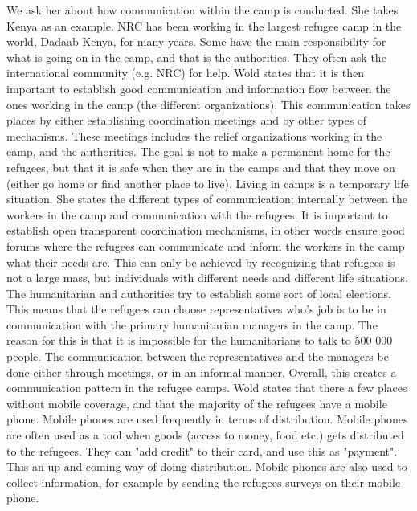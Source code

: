 We ask her about how communication within the camp is conducted. She takes Kenya as an example. NRC has been working in the largest refugee camp in the world, Dadaab Kenya, for many years.  Some have the main responsibility for what is going on in the camp, and that is the  authorities. They often ask the international community (e.g. NRC) for help. Wold states that it is then important to establish good communication and information flow between the ones working in the camp (the different organizations). This communication takes places by either establishing coordination meetings and by other types of mechanisms. These meetings includes the relief organizations working in the camp, and the authorities. The goal is not to make a permanent home for the refugees, but that it is safe when they are in the camps and that they move on (either go home or find another place to live). Living in camps is a temporary life situation. She states the different types of communication; internally between the workers in the camp and communication with the refugees. It is important to establish open transparent coordination mechanisms, in other words ensure good forums where the refugees can communicate and inform the workers in the camp what their needs are. This can only be achieved by recognizing that refugees is not a large mass, but individuals with different needs and different life situations. The humanitarian and authorities try to establish some sort of local elections. This means that the refugees can choose representatives who's job is to be in communication with the primary humanitarian managers in the camp. The reason for this is that it is impossible for the humanitarians to talk to 500 000 people. The communication between the representatives and the managers be done either through meetings, or in an informal manner. Overall, this creates a communication pattern in the refugee camps. Wold states that there a few places without mobile coverage, and that the majority of the refugees have a mobile phone. Mobile phones are used frequently in terms of distribution. Mobile phones are often used as a tool when goods (access to money, food etc.) gets distributed to the refugees. They can "add credit" to their card, and use this as "payment". This an up-and-coming way of doing distribution. Mobile phones are also used to collect information, for example by sending the refugees surveys on their mobile phone. 


